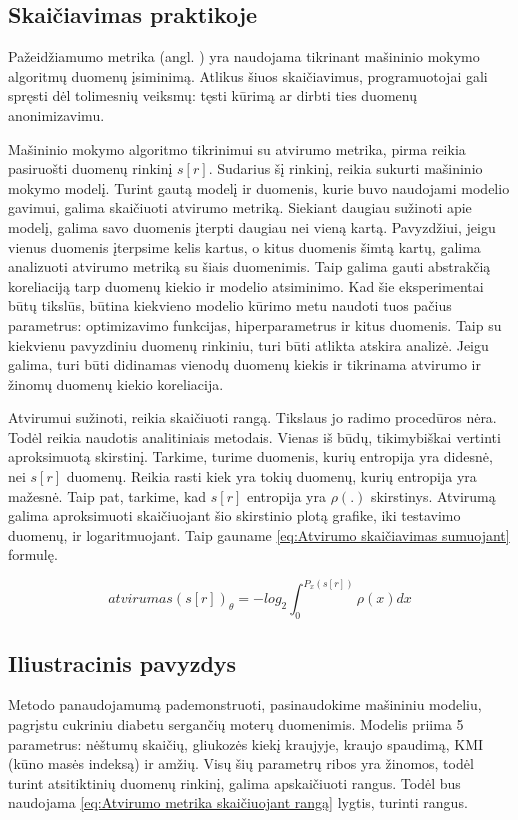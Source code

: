 \documentclass{VUMIFInfBakalaurinis}
\begin{document}
\subsection{Skaičiavimas praktikoje}
\par Pažeidžiamumo metrika  (angl. ) yra naudojama tikrinant mašininio mokymo algoritmų duomenų įsiminimą. Atlikus šiuos skaičiavimus, programuotojai gali spręsti dėl tolimesnių veiksmų: tęsti kūrimą ar dirbti ties duomenų anonimizavimu.
\par Mašininio mokymo algoritmo tikrinimui su atvirumo metrika, pirma reikia pasiruošti duomenų rinkinį $s[r]$. Sudarius šį rinkinį, reikia sukurti mašininio mokymo modelį. Turint gautą modelį ir duomenis, kurie buvo naudojami modelio gavimui, galima skaičiuoti atvirumo metriką. Siekiant daugiau sužinoti apie modelį, galima savo duomenis įterpti daugiau nei vieną kartą. Pavyzdžiui, jeigu vienus duomenis įterpsime kelis kartus, o kitus duomenis šimtą kartų, galima analizuoti atvirumo metriką su šiais duomenimis. Taip galima gauti abstrakčią koreliaciją tarp duomenų kiekio ir modelio atsiminimo. Kad šie eksperimentai būtų tikslūs, būtina kiekvieno modelio kūrimo metu naudoti tuos pačius parametrus: optimizavimo funkcijas, hiperparametrus ir kitus duomenis. Taip su kiekvienu pavyzdiniu duomenų rinkiniu, turi būti atlikta atskira analizė. Jeigu galima, turi būti didinamas vienodų duomenų kiekis ir tikrinama atvirumo ir žinomų duomenų kiekio koreliacija.
\par Atvirumui sužinoti, reikia skaičiuoti rangą. Tikslaus jo radimo procedūros nėra. Todėl reikia naudotis analitiniais metodais. Vienas iš būdų, tikimybiškai vertinti aproksimuotą skirstinį. Tarkime, turime duomenis, kurių entropija yra didesnė, nei $s[r]$ duomenų. Reikia rasti kiek yra tokių duomenų, kurių entropija yra mažesnė. Taip pat, tarkime, kad $s[r]$ entropija yra $\rho(.)$ skirstinys. Atvirumą galima aproksimuoti skaičiuojant šio skirstinio plotą grafike, iki testavimo duomenų, ir logaritmuojant.
Taip gauname \eqref{eq:Atvirumo skaičiavimas sumuojant} formulę.

\begin{equation}
atvirumas(s[r])_{\theta} = -log_{2} \int_{0}^{P_{x}(s[r])} \rho(x)dx
\label{eq:Atvirumo skaičiavimas sumuojant}
\end{equation}

\subsection{Iliustracinis pavyzdys}
\par Metodo panaudojamumą pademonstruoti, pasinaudokime mašininiu modeliu, pagrįstu cukriniu diabetu sergančių moterų duomenimis. Modelis priima 5 parametrus: nėštumų skaičių, gliukozės kiekį kraujyje, kraujo spaudimą, KMI (kūno masės indeksą) ir amžių. Visų šių parametrų ribos yra žinomos, todėl turint atsitiktinių duomenų rinkinį, galima apskaičiuoti rangus. Todėl bus naudojama \eqref{eq:Atvirumo metrika skaičiuojant rangą} lygtis, turinti rangus.
\end{document}
